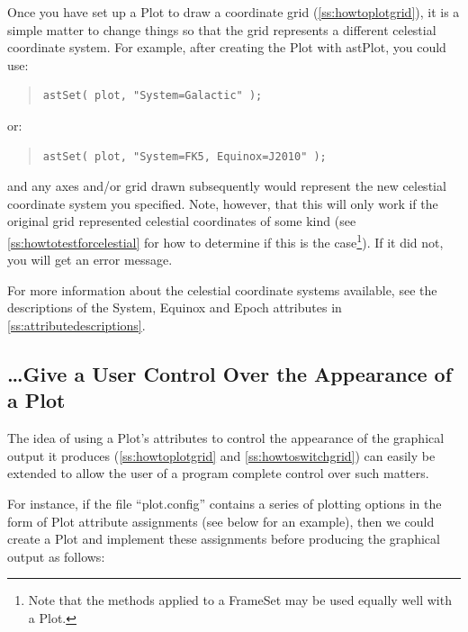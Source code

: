 \documentclass[twoside,11pt]{article}
\newcommand{\htmlref}[2]{#1}
\newcommand{\appref}[1]{Appendix~\ref{#1}}
\newcommand{\secref}[1]{\S\ref{#1}}
\renewcommand{\appref}[1]{\ref{#1}}
\renewcommand{\secref}[1]{\ref{#1}}
\begin{document}
Once you have set up a \htmlref{Plot}{Plot} to draw a coordinate grid
(\secref{ss:howtoplotgrid}), it is a simple matter to change things so
that the grid represents a different celestial coordinate system. For
example, after creating the Plot with \htmlref{astPlot}{astPlot}, you could use:

\begin{quote}
\small
\begin{verbatim}
astSet( plot, "System=Galactic" );
\end{verbatim}
\normalsize
\end{quote}
or:
\begin{quote}
\small
\begin{verbatim}
astSet( plot, "System=FK5, Equinox=J2010" );
\end{verbatim}
\normalsize
\end{quote}

and any axes and/or grid drawn subsequently would represent the new
celestial coordinate system you specified.  Note, however, that this
will only work if the original grid represented celestial coordinates
of some kind (see \secref{ss:howtotestforcelestial} for how to
determine if this is the case\footnote{Note that the methods applied
to a \htmlref{FrameSet}{FrameSet} may be used equally well with a Plot.}). If it did not,
you will get an error message.

For more information about the celestial coordinate systems available,
see the descriptions of the \htmlref{System}{System}, \htmlref{Equinox}{Equinox} and \htmlref{Epoch}{Epoch} attributes in
\appref{ss:attributedescriptions}.

\subsection{\ldots Give a User Control Over the Appearance of a Plot}

The idea of using a \htmlref{Plot}{Plot}'s attributes to control the appearance of the
graphical output it produces (\secref{ss:howtoplotgrid} and
\secref{ss:howtoswitchgrid}) can easily be extended to allow the user
of a program complete control over such matters.

For instance, if the file ``plot.config'' contains a series of
plotting options in the form of Plot attribute assignments (see below
for an example), then we could create a Plot and implement these
assignments before producing the graphical output as follows:
\end{document}
